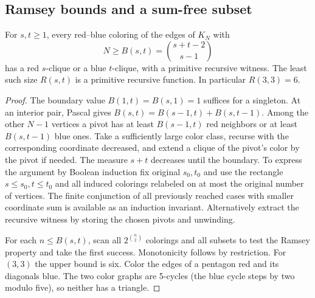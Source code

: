 \subsection{Ramsey bounds and a sum-free subset}

\begin{theorem}\label{result31}\label{thm:graph-ramsey}
For $s,t\ge1$, every red--blue coloring of the edges of $K_N$ with
\[
 N\ge B(s,t)=\binom{s+t-2}{s-1}
\]
has a red $s$-clique or a blue $t$-clique, with a primitive recursive witness. The least such size $R(s,t)$ is a primitive recursive function. In particular $R(3,3)=6$.
\end{theorem}
\begin{proof}
The boundary value $B(1,t)=B(s,1)=1$ suffices for a singleton. At an interior pair, Pascal gives $B(s,t)=B(s-1,t)+B(s,t-1)$. Among the other $N-1$ vertices a pivot has at least $B(s-1,t)$ red neighbors or at least $B(s,t-1)$ blue ones. Take a sufficiently large color class, recurse with the corresponding coordinate decreased, and extend a clique of the pivot's color by the pivot if needed. The measure $s+t$ decreases until the boundary. To express the argument by Boolean induction fix original $s_0,t_0$ and use the rectangle $s\le s_0,t\le t_0$ and all induced colorings relabeled on at most the original number of vertices. The finite conjunction of all previously reached cases with smaller coordinate sum is available as an induction invariant. Alternatively extract the recursive witness by storing the chosen pivots and unwinding.

For each $n\le B(s,t)$, scan all $2^{\binom n2}$ colorings and all subsets to test the Ramsey property and take the first success. Monotonicity follows by restriction. For $(3,3)$ the upper bound is six. Color the edges of a pentagon red and its diagonals blue. The two color graphs are 5-cycles (the blue cycle steps by two modulo five), so neither has a triangle.
\end{proof}

